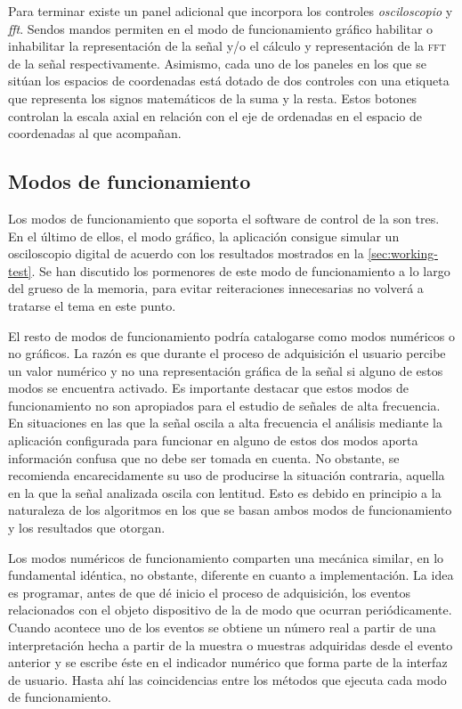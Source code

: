 Para terminar existe un panel adicional que incorpora los controles
\emph{osciloscopio} y \emph{fft}. Sendos mandos permiten en el modo de
funcionamiento gráfico habilitar o inhabilitar la representación de la
señal y/o el cálculo y representación de la \textsc{fft} de la señal
respectivamente. Asimismo, cada uno de los paneles en los que se sitúan los
espacios de coordenadas está dotado de dos controles con una etiqueta que
representa los signos matemáticos de la suma y la resta. Estos botones
controlan la escala axial en relación con el eje de ordenadas en el espacio
de coordenadas al que acompañan.


\subsection{Modos de funcionamiento}\label{subsec:working-modes}

Los modos de funcionamiento que soporta el software de control de la
\kpci{} son tres. En el último de ellos, el modo gráfico, la aplicación
consigue simular un osciloscopio digital de acuerdo con los resultados
mostrados en la \vref{sec:working-test}. Se han discutido los pormenores de
este modo de funcionamiento a lo largo del grueso de la memoria, para
evitar reiteraciones innecesarias no volverá a tratarse el tema en este
punto.

El resto de modos de funcionamiento podría catalogarse como modos numéricos
o no gráficos. La razón es que durante el proceso de adquisición el usuario
percibe un valor numérico y no una representación gráfica de la señal si
alguno de estos modos se encuentra activado. Es importante destacar que
estos modos de funcionamiento no son apropiados para el estudio de señales
de alta frecuencia. En situaciones en las que la señal oscila a alta
frecuencia el análisis mediante la aplicación configurada para funcionar en
alguno de estos dos modos aporta información confusa que no debe ser tomada
en cuenta. No obstante, se recomienda encarecidamente su uso de producirse
la situación contraria, aquella en la que la señal analizada oscila con
lentitud. Esto es debido en principio a la naturaleza de los algoritmos en
los que se basan ambos modos de funcionamiento y los resultados que
otorgan.%

Los modos numéricos de funcionamiento comparten una mecánica similar, en lo
fundamental idéntica, no obstante, diferente en cuanto a implementación. La
idea es programar, antes de que dé inicio el proceso de adquisición, los
eventos relacionados con el objeto dispositivo de la \datx{} de modo que
ocurran periódicamente. Cuando acontece uno de los eventos se obtiene un
número real a partir de una interpretación hecha a partir de la muestra o
muestras adquiridas desde el evento anterior y se escribe éste en el
indicador numérico que forma parte de la interfaz de usuario. Hasta ahí las
coincidencias entre los métodos que ejecuta cada modo de
funcionamiento.%

